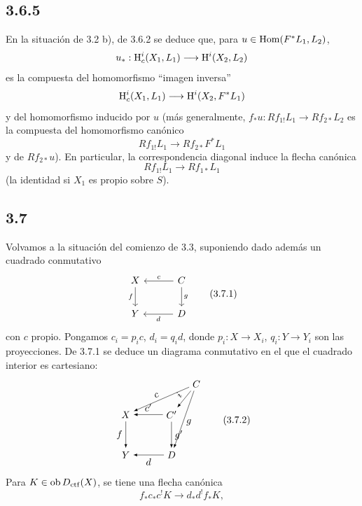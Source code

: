 \subsection*{3.6.5}
En la situación de 3.2 b), de 3.6.2 se deduce que, para $u\in\operatorname{Hom}(F^*L_1,L_2)$,
\[
u_*:\mathrm{H}_c^i(X_1,L_1)\longrightarrow \mathrm{H}^i(X_2,L_2)
\]
es la compuesta del homomorfismo ``imagen inversa''
\[
\mathrm{H}_c^i(X_1,L_1)\longrightarrow \mathrm{H}^i(X_2,F^*L_1)
\]
y del homomorfismo inducido por $u$ (más generalmente, $f_*u:Rf_{1!}L_1\to Rf_{2*}L_2$ es la compuesta del homomorfismo canónico
\[
Rf_{1!}L_1\longrightarrow Rf_{2*}F^*L_1
\]
y de $Rf_{2*}u$). En particular, la correspondencia diagonal induce la flecha canónica
\[
Rf_{1!}L_1\longrightarrow Rf_{1*}L_1
\]
(la identidad si $X_1$ es propio sobre $S$).

\subsection*{3.7}
Volvamos a la situación del comienzo de 3.3, suponiendo dado además un cuadrado conmutativo
\begin{equation}
\begin{tikzcd}[column sep=3em,row sep=2em]
X \arrow[d,"f"'] & C \arrow[l,"c"'] \arrow[d,"g"] \\
Y & D \arrow[l,"d"]
\end{tikzcd}
\tag{3.7.1}
\end{equation}
con $c$ propio. Pongamos $c_i=p_ic$, $d_i=q_id$, donde $p_i:X\to X_i$, $q_i:Y\to Y_i$ son las proyecciones. De 3.7.1 se deduce un diagrama conmutativo en el que el cuadrado interior es cartesiano:
\begin{equation}
\begin{tikzpicture}[>=latex,baseline=(current bounding box.center),scale=1]
\node (X) at (0,0) {$X$};
\node (Y) at (0,-1.45) {$Y$};
\node (Cp) at (1.65,0) {$C'$};
\node (D) at (1.65,-1.45) {$D$};
\node (C) at (2.55,1.1) {$C$};
\draw[->] (C) -- node[above,sloped,pos=.55] {$c$} (X);
\draw[->] (C) -- node[above,sloped,pos=.50] {$i$} (Cp);
\draw[->] (C) -- node[right,pos=.55] {$g$} (D);
\draw[->] (Cp) -- node[above] {$c'$} (X);
\draw[->] (Cp) -- node[right] {$g'$} (D);
\draw[->] (X) -- node[left] {$f$} (Y);
\draw[->] (D) -- node[below] {$d$} (Y);
\end{tikzpicture}
\tag{3.7.2}
\end{equation}
Para $K\in\operatorname{ob}D_{\mathrm{ctf}}(X)$, se tiene una flecha canónica
\begin{equation}
f_*c_*c^!K\longrightarrow d_*d^!f_*K,
\tag{3.7.3}
\end{equation}
